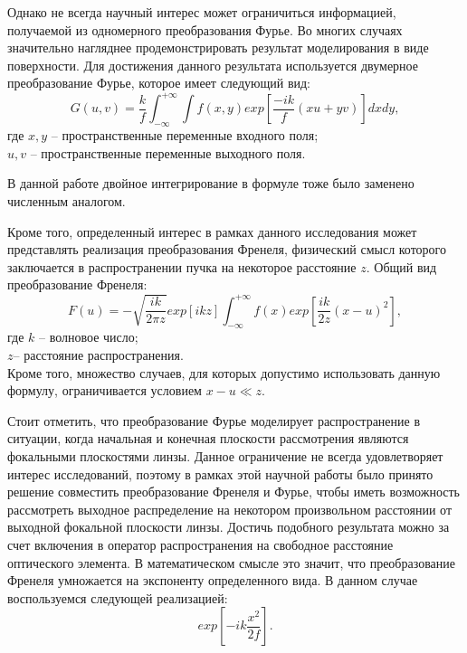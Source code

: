 {		Однако не всегда научный интерес может ограничиться информацией, получаемой из одномерного преобразования Фурье. Во многих случаях значительно нагляднее продемонстрировать результат моделирования в виде поверхности. Для достижения данного результата используется двумерное преобразование Фурье, которое имеет следующий вид:
		\begin{equation}\label{2d_four}
		G(u, v) = \frac{k}{f}\int_{-\infty}^{+\infty} \int f(x, y)exp[\frac{-ik}{f}(xu+yv)] dxdy,
		\end{equation}
	\tab	где $x, y$ -- пространственные переменные входного поля;  \\
	\tab \tab \hspace{-0.4cm}$u, v$ -- пространственные переменные выходного поля.  
	
	В данной работе двойное интегрирование в формуле тоже было заменено численным аналогом.
		
		Кроме того, определенный интерес в рамках данного исследования может представлять реализация преобразования Френеля, физический смысл которого заключается в распространении пучка на некоторое расстояние $z$. Общий вид преобразование Френеля:
		\begin{equation}\label{fresnel}
	F(u) = - \sqrt{\frac{ik}{2 \pi z}}exp[{ikz}]\int_{-\infty}^{+\infty}f(x) exp[{\frac{ik}{2z}(x - u)^2}],
	\end{equation}
	\tab где $k$ -- волновое число; \\
	\tab \tab\hspace{-0.4cm} $z $-- расстояние распространения.\\
	Кроме того, множество случаев, для которых допустимо использовать данную формулу, ограничивается условием $x-u\ll z$.
	
	Стоит отметить, что преобразование Фурье моделирует распространение в ситуации, когда начальная и конечная плоскости рассмотрения являются фокальными плоскостями  линзы. Данное ограничение не всегда удовлетворяет интерес исследований, поэтому в рамках этой научной работы было принято решение совместить преобразование Френеля и Фурье, чтобы иметь возможность рассмотреть выходное распределение на некотором произвольном расстоянии от выходной фокальной плоскости линзы. Достичь подобного результата можно за счет включения в оператор распространения на свободное расстояние оптического элемента. В математическом смысле это значит, что преобразование Френеля умножается на экспоненту определенного вида. В данном случае воспользуемся следующей реализацией:
	\begin{equation*}
	exp[-ik \frac{x^2}{2f} ].
	\end{equation*}
	
}
